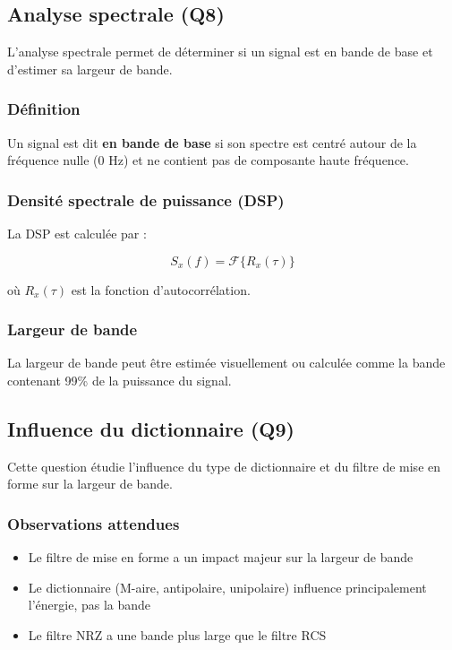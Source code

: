 \documentclass[12pt,a4paper]{article}
\begin{document}
\newpage

\subsection{Analyse spectrale (Q8)}

L'analyse spectrale permet de déterminer si un signal est en bande de base et d'estimer sa largeur de bande.

\subsubsection{Définition}

Un signal est dit \textbf{en bande de base} si son spectre est centré autour de la fréquence nulle (0 Hz) et ne contient pas de composante haute fréquence.

\subsubsection{Densité spectrale de puissance (DSP)}

La DSP est calculée par :

\begin{equation}
    S_x(f) = \mathcal{F}\{R_x(\tau)\}
\end{equation}

où $R_x(\tau)$ est la fonction d'autocorrélation.

\subsubsection{Largeur de bande}

La largeur de bande peut être estimée visuellement ou calculée comme la bande contenant 99\% de la puissance du signal.

\subsection{Influence du dictionnaire (Q9)}

Cette question étudie l'influence du type de dictionnaire et du filtre de mise en forme sur la largeur de bande.

\subsubsection{Observations attendues}

\begin{itemize}
    \item Le filtre de mise en forme a un impact majeur sur la largeur de bande
    \item Le dictionnaire (M-aire, antipolaire, unipolaire) influence principalement l'énergie, pas la bande
    \item Le filtre NRZ a une bande plus large que le filtre RCS
\end{itemize}
\end{document}
